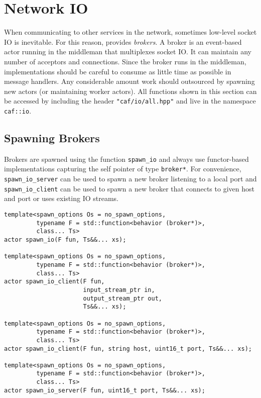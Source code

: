 \section{Network IO}

When communicating to other services in the network, sometimes low-level socket IO is inevitable.
For this reason, \lib provides \emph{brokers}.
A broker is an event-based actor running in the middleman that multiplexes socket IO.
It can maintain any number of acceptors and connections.
Since the broker runs in the middleman, implementations should be careful to consume as little time as possible in message handlers.
Any considerable amount work should outsourced by spawning new actors (or maintaining worker actors).
All functions shown in this section can be accessed by including the header \lstinline^"caf/io/all.hpp"^ and live in the namespace \lstinline^caf::io^.


\subsection{Spawning Brokers}

Brokers are spawned using the function \lstinline^spawn_io^ and always use functor-based implementations capturing the self pointer of type \lstinline^broker*^.
For convenience, \lstinline^spawn_io_server^ can be used to spawn a new broker listening to a local port and \lstinline^spawn_io_client^ can be used to spawn a new broker that connects to given host and port or uses existing IO streams.

\begin{lstlisting}
template<spawn_options Os = no_spawn_options,
         typename F = std::function<behavior (broker*)>,
         class... Ts>
actor spawn_io(F fun, Ts&&... xs);

template<spawn_options Os = no_spawn_options,
         typename F = std::function<behavior (broker*)>,
         class... Ts>
actor spawn_io_client(F fun,
                      input_stream_ptr in,
                      output_stream_ptr out,
                      Ts&&... xs);

template<spawn_options Os = no_spawn_options,
         typename F = std::function<behavior (broker*)>,
         class... Ts>
actor spawn_io_client(F fun, string host, uint16_t port, Ts&&... xs);

template<spawn_options Os = no_spawn_options,
         typename F = std::function<behavior (broker*)>,
         class... Ts>
actor spawn_io_server(F fun, uint16_t port, Ts&&... xs);
\end{lstlisting}


